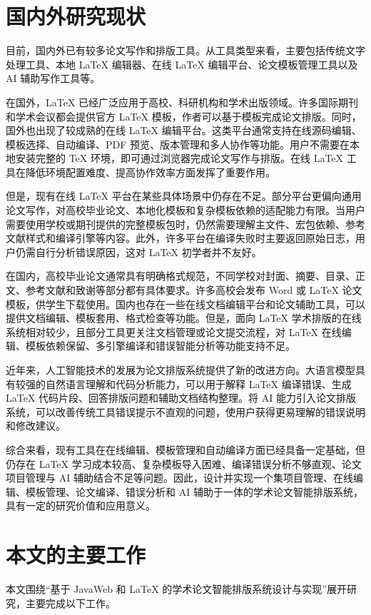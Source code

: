 \documentclass{xduugthesis}
\begin{document}
\section{国内外研究现状}
目前，国内外已有较多论文写作和排版工具。从工具类型来看，主要包括传统文字处理工具、本地 LaTeX 编辑器、在线 LaTeX 编辑平台、论文模板管理工具以及 AI 辅助写作工具等\cite{huang2018lyx}。

在国外，LaTeX 已经广泛应用于高校、科研机构和学术出版领域\cite{bahls2015latexnics}。许多国际期刊和学术会议都会提供官方 LaTeX 模板，作者可以基于模板完成论文排版。同时，国外也出现了较成熟的在线 LaTeX 编辑平台。这类平台通常支持在线源码编辑、模板选择、自动编译、PDF 预览、版本管理和多人协作等功能\cite{zhang2013onlinepaper}。用户不需要在本地安装完整的 TeX 环境，即可通过浏览器完成论文写作与排版。在线 LaTeX 工具在降低环境配置难度、提高协作效率方面发挥了重要作用。

但是，现有在线 LaTeX 平台在某些具体场景中仍存在不足。部分平台更偏向通用论文写作，对高校毕业论文、本地化模板和复杂模板依赖的适配能力有限。当用户需要使用学校或期刊提供的完整模板包时，仍然需要理解主文件、宏包依赖、参考文献样式和编译引擎等内容。此外，许多平台在编译失败时主要返回原始日志，用户仍需自行分析错误原因，这对 LaTeX 初学者并不友好。

在国内，高校毕业论文通常具有明确格式规范，不同学校对封面、摘要、目录、正文、参考文献和致谢等部分都有具体要求\cite{sun2022latexthesis}。许多高校会发布 Word 或 LaTeX 论文模板，供学生下载使用\cite{zhao2013latexxinjiang}。国内也存在一些在线文档编辑平台和论文辅助工具，可以提供文档编辑、模板套用、格式检查等功能。但是，面向 LaTeX 学术排版的在线系统相对较少，且部分工具更关注文档管理或论文提交流程，对 LaTeX 在线编辑、模板依赖保留、多引擎编译和错误智能分析等功能支持不足。

近年来，人工智能技术的发展为论文排版系统提供了新的改进方向。大语言模型具有较强的自然语言理解和代码分析能力，可以用于解释 LaTeX 编译错误、生成 LaTeX 代码片段、回答排版问题和辅助文档结构整理。将 AI 能力引入论文排版系统，可以改善传统工具错误提示不直观的问题，使用户获得更易理解的错误说明和修改建议。

综合来看，现有工具在在线编辑、模板管理和自动编译方面已经具备一定基础，但仍存在 LaTeX 学习成本较高、复杂模板导入困难、编译错误分析不够直观、论文项目管理与 AI 辅助结合不足等问题。因此，设计并实现一个集项目管理、在线编辑、模板管理、论文编译、错误分析和 AI 辅助于一体的学术论文智能排版系统，具有一定的研究价值和应用意义。

\section{本文的主要工作}
本文围绕“基于 JavaWeb 和 LaTeX 的学术论文智能排版系统设计与实现”展开研究，主要完成以下工作。
\end{document}
